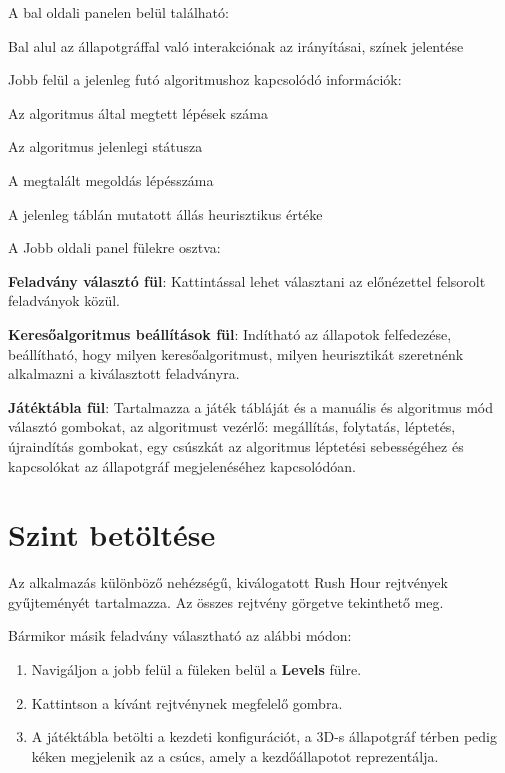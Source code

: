 A bal oldali panelen belül található:

\begin{compactitem}
    \item Bal alul az állapotgráffal való interakciónak az irányításai, színek jelentése
    \item Jobb felül a jelenleg futó algoritmushoz kapcsolódó információk:
    \begin{compactitem}
        \item Az algoritmus által megtett lépések száma
        \item Az algoritmus jelenlegi státusza
        \item A megtalált megoldás lépésszáma
        \item A jelenleg táblán mutatott állás heurisztikus értéke
    \end{compactitem}
\end{compactitem}

A Jobb oldali panel fülekre osztva:
\begin{compactitem}
		\item \textbf{Feladvány választó fül}: Kattintással lehet választani az előnézettel felsorolt feladványok közül. 
		\item \textbf{Keresőalgoritmus beállítások fül}: Indítható az állapotok felfedezése, beállítható, hogy milyen keresőalgoritmust, milyen heurisztikát szeretnénk alkalmazni a kiválasztott feladványra.
		\item \textbf{Játéktábla fül}: Tartalmazza a játék tábláját és a manuális és algoritmus mód választó gombokat, az algoritmust vezérlő: megállítás, folytatás, léptetés, újraindítás gombokat, egy csúszkát az algoritmus léptetési sebességéhez és kapcsolókat az állapotgráf megjelenéséhez kapcsolódóan.
	\end{compactitem}
\section{Szint betöltése}

Az alkalmazás különböző nehézségű, kiválogatott Rush Hour rejtvények gyűjteményét tartalmazza. Az összes rejtvény görgetve tekinthető meg.

Bármikor másik feladvány választható az alábbi módon:
\begin{enumerate}
    \item Navigáljon a jobb felül a füleken belül a \textbf{Levels} fülre.
    \item Kattintson a kívánt rejtvénynek megfelelő gombra.
    \item A játéktábla betölti a kezdeti konfigurációt, a 3D-s állapotgráf térben pedig kéken megjelenik az a csúcs, amely a kezdőállapotot reprezentálja.
\end{enumerate}

